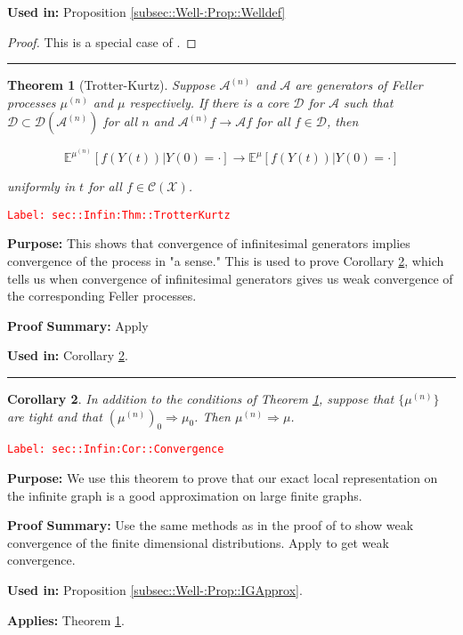 \documentclass[12pt]{article}
\newcommand{\mb}{\mathbb}
\newcommand{\mc}{\mathcal}
\newcommand{\ra}{\rightarrow}
\newcommand{\tr}{\textcolor{red}}
\newcommand{\labe}[1]{\tr{\texttt{Label: #1}}}
\newcommand{\purpose}{\textbf{Purpose: }}
\newcommand{\pfsum}{\textbf{Proof Summary: }}
\newcommand{\usein}{\textbf{Used in: }}
\newcommand{\app}{\textbf{Applies: }}
\newcommand{\lin}{\rule{\linewidth}{0.4 pt}}
\newcommand{\exmu}[2]{\mb{E}^{#1}\left[#2\right]}	%
\renewcommand{\t}{t}							%
\newcommand{\IG}{\mc{A}}						%
\newcommand{\tp}[1]{(#1)}						%
\newcommand{\ts}[1]{_{#1}}						%
\newcommand{\sln}[1]{^{(#1)}}					%
\newcommand{\core}{\mc{D}}						%
\newcommand{\cont}{\mc{C}}						%
\newcommand{\m}{\mu}							%
\newcommand{\XX}{Y}								%
\newcommand{\spce}{\mc{X}}						%
\newtheorem{thms}{Theorem}[section]
\newtheorem{coro}[thms]{Corollary}
\begin{document}
\usein Proposition \ref{subsec::Well-:Prop::Welldef}

\begin{proof}
This is a special case of \cite[Chapter 1, Theorem 3.9]{Lig85}.
\end{proof}
\lin

\begin{thms}[Trotter-Kurtz]
Suppose \(\IG\sln{n}\) and \(\IG\) are generators of Feller processes \(\m\sln{n}\) and \(\m\) respectively. If there is a core \(\core\) for \(\IG\) such that \(\core \subset \mc{D}(\IG\sln{n})\) for all \(n\) and \(\IG\sln{n} f \ra \IG f\) for all \(f \in \core\), then 

\[\exmu{\m\sln{n}}{f(\XX\tp{\t})|\XX\tp{0}=\cdot} \ra \exmu{\mu}{f(\XX\tp{\t})|\XX\tp{0}=\cdot}\]

uniformly in \(\t\) for all \(f \in \cont(\spce)\).
\label{sec::Infin:Thm::TrotterKurtz}
\end{thms}
\labe{sec::Infin:Thm::TrotterKurtz}

\purpose This shows that convergence of infinitesimal generators implies convergence of the process in "a sense." This is used to prove Corollary \ref{sec::Infin:Cor::Convergence}, which tells us when convergence of infinitesimal generators gives us weak convergence of the corresponding Feller processes.

\pfsum Apply \cite[Theorem 2.12]{Lig85}

\usein Corollary \ref{sec::Infin:Cor::Convergence}.

\lin

\begin{coro}
In addition to the conditions of Theorem \ref{sec::Infin:Thm::TrotterKurtz}, suppose that \(\{\m\sln{n}\}\) are tight and that \((\m\sln{n})\ts{0} \Rightarrow \m\ts{0}\). Then \(\m\sln{n} \Rightarrow \m\).
\label{sec::Infin:Cor::Convergence}
\end{coro}
\labe{sec::Infin:Cor::Convergence}

\purpose We use this theorem to prove that our exact local representation on the infinite graph is a good approximation on large finite graphs.

\pfsum Use the same methods as in the proof of \cite[Theorem 4.2]{Kur81} to show weak convergence of the finite dimensional distributions. Apply \cite[Theorem 13.1]{Bil99} to get weak convergence.

\usein Proposition \ref{subsec::Well-:Prop::IGApprox}.

\app Theorem \ref{sec::Infin:Thm::TrotterKurtz}.
\end{document}

